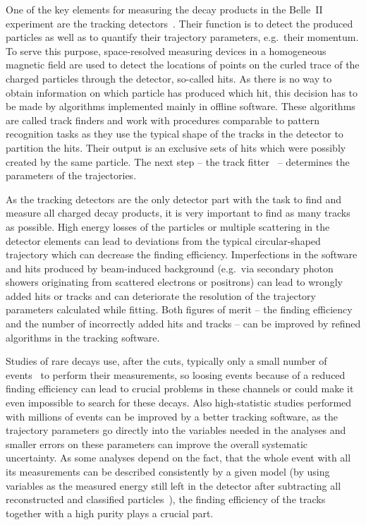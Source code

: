 
One of the key elements for measuring the decay products in the Belle~II experiment are the tracking detectors~\cite{tdr}. Their function is to detect the produced particles as well as to quantify their trajectory parameters, e.g.\ their momentum. To serve this purpose, space-resolved measuring devices in a homogeneous magnetic field are used to detect the locations of points on the curled trace of the charged particles through the detector, so-called hits. As there is no way to obtain information on which particle has produced which hit, this decision has to be made by algorithms implemented mainly in offline software. These algorithms are called track finders and work with procedures comparable to pattern recognition tasks as they use the typical shape of the tracks in the detector to partition the hits. Their output is an exclusive sets of hits which were possibly created by the same particle. The next step -- the track fitter~\cite{genfit} -- determines the parameters of the trajectories.

As the tracking detectors are the only detector part with the task to find and measure all charged decay products, it is very important to find as many tracks as possible. High energy losses of the particles or multiple scattering in the detector elements can lead to deviations from the typical circular-shaped trajectory which can decrease the finding efficiency. Imperfections in the software and hits produced by beam-induced background (e.g.\ via secondary photon showers originating from scattered electrons or positrons) can lead to wrongly added hits or tracks and can deteriorate the resolution of the trajectory parameters calculated while fitting. Both figures of merit -- the finding efficiency and the number of incorrectly added hits and tracks -- can be improved by refined algorithms in the tracking software.

Studies of rare decays use, after the cuts, typically only a small number of events~\cite{lutz} to perform their measurements, so loosing events because of a reduced finding efficiency can lead to crucial problems in these channels or could make it even impossible to search for these decays. Also high-statistic studies performed with millions of events can be improved by a better tracking software, as the trajectory parameters go directly into the variables needed in the analyses and smaller errors on these parameters can improve the overall systematic uncertainty. As some analyses depend on the fact, that the whole event with all its measurements can be described consistently by a given model (by using variables as the measured energy still left in the detector after subtracting all reconstructed and classified particles~\cite{christian_phd}), the finding efficiency of the tracks together with a high purity plays a crucial part.

